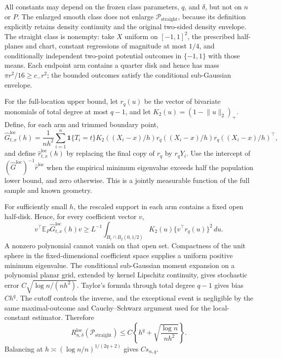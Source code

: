 All constants may depend on the frozen class parameters, \(q\), and \(\delta\), but not on \(n\) or \(P\).  The enlarged smooth class does not enlarge \(\mathcal P_{\mathrm{straight}}\), because its definition explicitly retains density continuity and the original two-sided density envelope.  The straight class is nonempty: take \(X\) uniform on \([-1,1]^2\), the prescribed half-planes and chart, constant regressions of magnitude at most \(1/4\), and conditionally independent two-point potential outcomes in \(\{-1,1\}\) with those means.  Each endpoint arm contains a quarter disk and hence has mass \(\pi r^2/16\geq c_-r^2\); the bounded outcomes satisfy the conditional sub-Gaussian envelope.

For the full-location upper bound, let \(r_q(u)\) be the vector of bivariate monomials of total degree at most \(q-1\), and let \(K_2(u)=(1-\lVert u\rVert_2)_+\).  Define, for each arm and trimmed boundary point,
\[
 \widehat G^{\mathrm{loc}}_{t,x}(h)=\frac1{nh^2}\sum_{i=1}^n
 \mathbf1\{T_i=t\}K_2((X_i-x)/h)
 r_q((X_i-x)/h)r_q((X_i-x)/h)^\top,
\]
and define \(\widehat r^{\mathrm{loc}}_{t,x}(h)\) by replacing the final copy of \(r_q\) by \(r_qY_i\).  Use the intercept of \((\widehat G^{\mathrm{loc}})^{-1}\widehat r^{\mathrm{loc}}\) when the empirical minimum eigenvalue exceeds half the population lower bound, and zero otherwise.  This is a jointly measurable function of the full sample and known geometry.

For sufficiently small \(h\), the rescaled support in each arm contains a fixed open half-disk.  Hence, for every coefficient vector \(v\),
\[
 v^\top\mathbb E_P\widehat G^{\mathrm{loc}}_{t,x}(h)v
 \geq L^{-1}\int_{H_t\cap B_2(0,1/2)}K_2(u)
 \{v^\top r_q(u)\}^2\,du.
\]
A nonzero polynomial cannot vanish on that open set.  Compactness of the unit sphere in the fixed-dimensional coefficient space supplies a uniform positive minimum eigenvalue.  The conditional sub-Gaussian moment expansion on a polynomial planar grid, extended by kernel Lipschitz continuity, gives stochastic error \(C\sqrt{\log n/(nh^2)}\).  Taylor's formula through total degree \(q-1\) gives bias \(Ch^q\).  The cutoff controls the inverse, and the exceptional event is negligible by the same maximal-outcome and Cauchy--Schwarz argument used for the local-constant estimator.  Therefore
\[
 R_{n,\delta}^{\mathrm{loc}}(\mathcal P_{\mathrm{straight}})
 \leq C\left\{h^q+\sqrt{\frac{\log n}{nh^2}}\right\}.
\]
Balancing at \(h\asymp(\log n/n)^{1/(2q+2)}\) gives \(Cs_{n,q}\).

